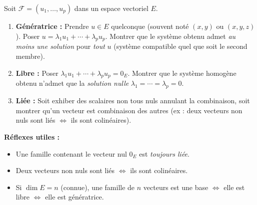 \documentclass[11pt]{article}
\begin{document}
\begin{methode}
Soit $\mathcal{F}=(u_1,\ldots,u_p)$ dans un espace vectoriel $E$.
\begin{enumerate}
\item \textbf{Génératrice :} Prendre $u\in E$ quelconque (souvent noté $(x,y)$ ou $(x,y,z)$). Poser $u=\lambda_1 u_1+\cdots+\lambda_p u_p$. Montrer que le système obtenu admet \emph{au moins une solution} pour \emph{tout} $u$ (système compatible quel que soit le second membre).
\item \textbf{Libre :} Poser $\lambda_1 u_1+\cdots+\lambda_p u_p=0_E$. Montrer que le système homogène obtenu n'admet que la \emph{solution nulle} $\lambda_1=\cdots=\lambda_p=0$.
\item \textbf{Liée :} Soit exhiber des scalaires non tous nuls annulant la combinaison, soit montrer qu'un vecteur est combinaison des autres (ex : deux vecteurs non nuls sont liés $\iff$ ils sont colinéaires).
\end{enumerate}
\textbf{Réflexes utiles :}
\begin{itemize}
\item Une famille contenant le vecteur nul $0_E$ est \emph{toujours liée}.
\item Deux vecteurs non nuls sont liés $\iff$ ils sont colinéaires.
\item Si $\dim E=n$ (connue), une famille de $n$ vecteurs est une base $\iff$ elle est libre $\iff$ elle est génératrice.
\end{itemize}
\end{methode}
\end{document}
